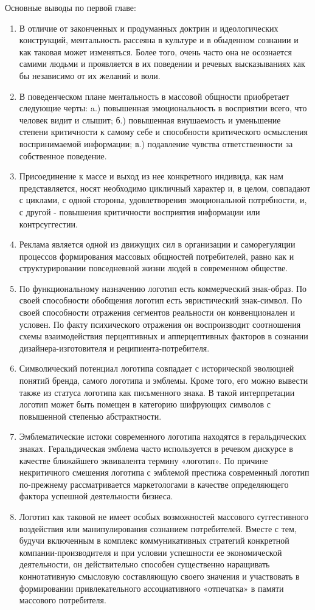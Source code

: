 Основные выводы по первой главе:\begin{enumerate}
\item В отличие от законченных и продуманных доктрин и идеологических конструкций, 
ментальность рассеяна в культуре и в обыденном сознании и как таковая может изменяться. Более того, очень часто она не осознается самими людьми и  проявляется в их поведении и речевых высказываниях как бы независимо от их желаний и воли.
\item В поведенческом плане ментальность в массовой общности приобретает следующие черты: a.) повышенная эмоциональность в восприятии всего, что человек видит и слышит;
б.) повышенная внушаемость и  уменьшение степени критичности к самому себе и 
способности критического осмысления воспринимаемой информации; в.) подавление чувства ответственности за собственное поведение.
\item Присоединение к массе и выход из нее конкретного индивида, как нам представляется, носят необходимо цикличный характер и, в целом, совпадают с циклами, с одной стороны,  удовлетворения эмоциональной потребности, и, с другой  - повышения критичности восприятия информации или контрсуггестии.
\item Реклама является одной из движущих сил в организации и  саморегуляции процессов формирования массовых общностей потребителей, равно как и структурировании повседневной жизни людей в современном обществе.
\item По функциональному назначению логотип есть коммерческий знак-образ. По своей способности обобщения логотип есть эвристический знак-символ. По своей способности отражения сегментов реальности он конвенционален и условен. По факту психического отражения он воспроизводит соотношения схемы взаимодействия перцептивных и апперцептивных факторов в сознании дизайнера-изготовителя и реципиента-потребителя.
\item Символический потенциал логотипа совпадает с исторической эволюцией понятий бренда, самого логотипа  и эмблемы. Кроме того, его можно вывести также из статуса логотипа как письменного знака. В такой интерпретации логотип может быть помещен в категорию шифрующих символов с повышенной степенью абстрактности.
\item Эмблематические истоки современного логотипа находятся в геральдических знаках. Геральдическая эмблема часто используется в речевом дискурсе в качестве ближайшего эквивалента термину «логотип».  По причине некритичного смешения логотипа с эмблемой престижа современный логотип по-прежнему рассматривается  маркетологами в качестве определяющего фактора успешной деятельности бизнеса.
\item Логотип как таковой не имеет особых возможностей массового суггестивного воздействия или манипулирования сознанием потребителей. Вместе с тем, будучи включенным в комплекс коммуникативных стратегий конкретной компании-производителя и при условии успешности ее экономической деятельности, он действительно способен существенно наращивать коннотативную смысловую составляющую своего значения и участвовать в формировании привлекательного ассоциативного «отпечатка» в памяти массового потребителя.
\end{enumerate}